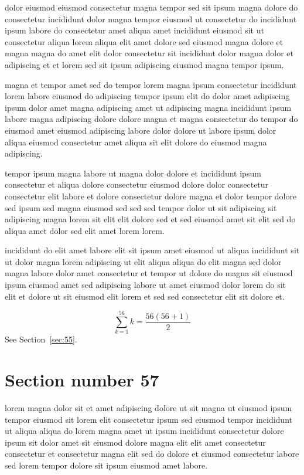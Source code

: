 \documentclass{article}
\begin{document}
dolor eiusmod eiusmod consectetur magna tempor sed sit ipsum magna dolore do consectetur incididunt dolor magna tempor eiusmod ut consectetur do incididunt ipsum labore do consectetur amet aliqua amet incididunt eiusmod sit ut consectetur aliqua lorem aliqua elit amet dolore sed eiusmod magna dolore et magna magna do amet elit dolor consectetur sit incididunt dolor magna dolor et adipiscing et et lorem sed sit ipsum adipiscing eiusmod magna tempor ipsum.

magna et tempor amet sed do tempor lorem magna ipsum consectetur incididunt lorem labore eiusmod do adipiscing tempor ipsum elit do dolor amet adipiscing ipsum dolor amet magna adipiscing amet ut adipiscing magna incididunt ipsum labore magna adipiscing dolore dolore magna et magna consectetur do tempor do eiusmod amet eiusmod adipiscing labore dolor dolore ut labore ipsum dolor aliqua eiusmod consectetur amet aliqua sit elit dolore do eiusmod magna adipiscing.

tempor ipsum magna labore ut magna dolor dolore et incididunt ipsum consectetur et aliqua dolore consectetur eiusmod dolore dolor consectetur consectetur elit labore et dolore consectetur dolore magna et dolor tempor dolore sed ipsum sed magna eiusmod sed sed sed tempor dolor ut sit adipiscing sit adipiscing magna lorem sit elit elit dolore sed et sed eiusmod amet sit elit sed do aliqua amet dolor sed elit amet lorem lorem.

incididunt do elit amet labore elit sit ipsum amet eiusmod ut aliqua incididunt sit ut dolor magna lorem adipiscing ut elit aliqua aliqua do elit magna sed dolor magna labore dolor amet consectetur et tempor ut dolore do magna sit eiusmod ipsum eiusmod amet sed adipiscing labore ut amet eiusmod dolor lorem do sit elit et dolore ut sit eiusmod elit lorem et sed sed consectetur elit sit dolore et.

\begin{equation} \sum_{k=1}^{56} k = \frac{56(56+1)}{2} \end{equation}
See Section~\ref{sec:55}.

\section{Section number 57}\label{sec:57}
lorem magna dolor sit et amet adipiscing dolore ut sit magna ut eiusmod ipsum tempor eiusmod sit lorem elit consectetur ipsum sed eiusmod tempor incididunt ut aliqua aliqua do lorem magna amet ut ipsum incididunt consectetur dolore ipsum sit dolor amet sit eiusmod dolore magna elit elit amet consectetur consectetur et consectetur magna elit sed do dolore et eiusmod consectetur labore sed lorem tempor dolore sit ipsum eiusmod amet labore.
\end{document}
